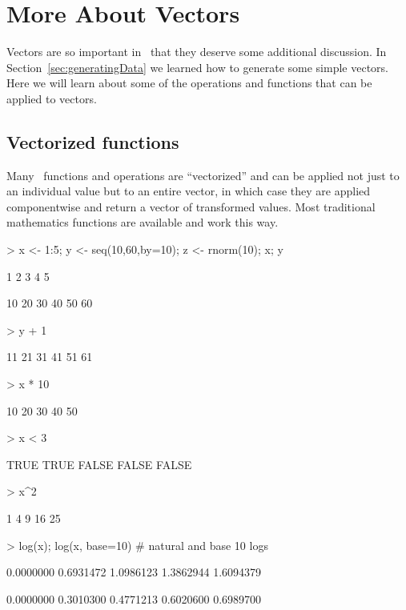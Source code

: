 \section{More About Vectors}
Vectors are so important in \R\ that they deserve some additional discussion.
In Section~\ref{sec:generatingData} we learned how to generate some simple
vectors.  Here we will learn about some of the operations and functions
that can be applied to vectors.

\subsection{Vectorized functions}

Many \R\ functions and operations are ``vectorized'' and can be applied
not just to an individual value but to an entire vector, in which case
they are applied componentwise and return a vector of transformed values.  
Most traditional mathematics functions are available and work this way.
%
%
%
%
%

\begin{Schunk}
\begin{Sinput}
> x <- 1:5; y <- seq(10,60,by=10); z <- rnorm(10); x; y
\end{Sinput}
\begin{Soutput}
[1] 1 2 3 4 5
\end{Soutput}
\begin{Soutput}
[1] 10 20 30 40 50 60
\end{Soutput}
\begin{Sinput}
> y + 1
\end{Sinput}
\begin{Soutput}
[1] 11 21 31 41 51 61
\end{Soutput}
\begin{Sinput}
> x * 10
\end{Sinput}
\begin{Soutput}
[1] 10 20 30 40 50
\end{Soutput}
\begin{Sinput}
> x < 3
\end{Sinput}
\begin{Soutput}
[1]  TRUE  TRUE FALSE FALSE FALSE
\end{Soutput}
\begin{Sinput}
> x^2
\end{Sinput}
\begin{Soutput}
[1]  1  4  9 16 25
\end{Soutput}
\begin{Sinput}
> log(x); log(x, base=10)            # natural and base 10 logs
\end{Sinput}
\begin{Soutput}
[1] 0.0000000 0.6931472 1.0986123 1.3862944 1.6094379
\end{Soutput}
\begin{Soutput}
[1] 0.0000000 0.3010300 0.4771213 0.6020600 0.6989700
\end{Soutput}
\end{Schunk}

